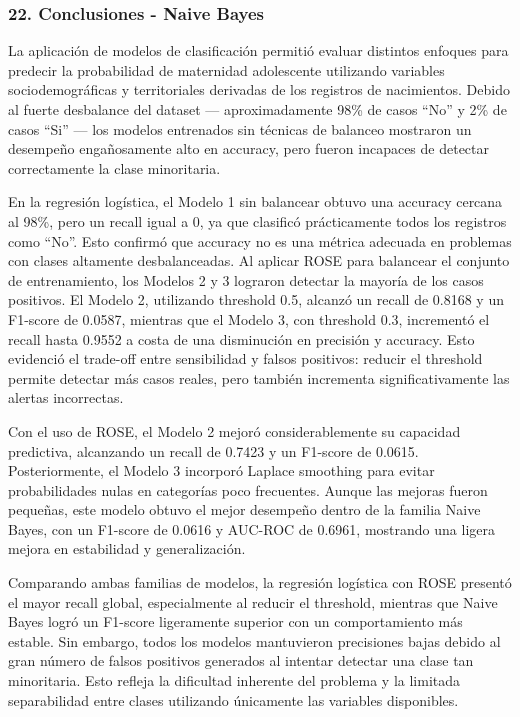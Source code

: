 \documentclass[
]{article}
\begin{document}
\subsubsection{22. Conclusiones - Naive
Bayes}\label{conclusiones---naive-bayes}

La aplicación de modelos de clasificación permitió evaluar distintos
enfoques para predecir la probabilidad de maternidad adolescente
utilizando variables sociodemográficas y territoriales derivadas de los
registros de nacimientos. Debido al fuerte desbalance del dataset ---
aproximadamente 98\% de casos ``No'' y 2\% de casos ``Si'' --- los
modelos entrenados sin técnicas de balanceo mostraron un desempeño
engañosamente alto en accuracy, pero fueron incapaces de detectar
correctamente la clase minoritaria.

En la regresión logística, el Modelo 1 sin balancear obtuvo una accuracy
cercana al 98\%, pero un recall igual a 0, ya que clasificó
prácticamente todos los registros como ``No''. Esto confirmó que
accuracy no es una métrica adecuada en problemas con clases altamente
desbalanceadas. Al aplicar ROSE para balancear el conjunto de
entrenamiento, los Modelos 2 y 3 lograron detectar la mayoría de los
casos positivos. El Modelo 2, utilizando threshold 0.5, alcanzó un
recall de 0.8168 y un F1-score de 0.0587, mientras que el Modelo 3, con
threshold 0.3, incrementó el recall hasta 0.9552 a costa de una
disminución en precisión y accuracy. Esto evidenció el trade-off entre
sensibilidad y falsos positivos: reducir el threshold permite detectar
más casos reales, pero también incrementa significativamente las alertas
incorrectas.

Con el uso de ROSE, el Modelo 2 mejoró considerablemente su capacidad
predictiva, alcanzando un recall de 0.7423 y un F1-score de 0.0615.
Posteriormente, el Modelo 3 incorporó Laplace smoothing para evitar
probabilidades nulas en categorías poco frecuentes. Aunque las mejoras
fueron pequeñas, este modelo obtuvo el mejor desempeño dentro de la
familia Naive Bayes, con un F1-score de 0.0616 y AUC-ROC de 0.6961,
mostrando una ligera mejora en estabilidad y generalización.

Comparando ambas familias de modelos, la regresión logística con ROSE
presentó el mayor recall global, especialmente al reducir el threshold,
mientras que Naive Bayes logró un F1-score ligeramente superior con un
comportamiento más estable. Sin embargo, todos los modelos mantuvieron
precisiones bajas debido al gran número de falsos positivos generados al
intentar detectar una clase tan minoritaria. Esto refleja la dificultad
inherente del problema y la limitada separabilidad entre clases
utilizando únicamente las variables disponibles.
\end{document}
